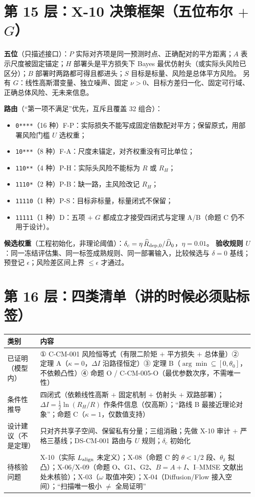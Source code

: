 \documentclass[UTF8,11pt,a4paper]{ctexart}
\begin{document}
\section{第 15 层：X-10 决策框架（五位布尔 $+$ $G$）}

\textbf{五位}（只描述接口）：$P$ 实际对齐项是同一预测时点、正确配对的平方距离；$A$ 表示尺度被固定锚定；$H$ 部署头是平方损失下 Bayes 最优仿射头（或实际头风险已区分）；$B$ 部署时两路都可得且都进头；$S$ 目标是标量、风险是总体平方风险。
另有 $G$：线性高斯潜变量、独立噪声、固定 $\nu>0$、目标方差归一化、固定可行域、正确总体风险、无未来信息。

\textbf{路由}（``第一项不满足''优先，互斥且覆盖 32 组合）：
\begin{itemize}
  \item \texttt{0****}（16 种）F-P：实际损失不能写成固定倍数配对平方；保留原式，用部署风险门槛 $U$ 选权重；
  \item \texttt{10***}（8 种）F-A：尺度未锚定，对齐权重没有可比单位；
  \item \texttt{110**}（4 种）P-H：实际头风险不能标为 $R$ 或 $R_H$；
  \item \texttt{1110*}（2 种）P-B：缺一路，主风险改记 $R_H$；
  \item \texttt{11110}（1 种）P-S：目标非标量，标量闭式不保留；
  \item \texttt{11111}（1 种）D：五项 $+$ $G$ 都成立才接受四闭式与定理 A/B（命题 C 仍不用于设计）。
\end{itemize}
\textbf{候选权重}（工程初始化，非理论阈值）：$\delta_c=\eta\,\widehat R_{{\rm dep},0}/\widehat D_0$，$\eta=0.01$。
\textbf{验收规则 $U$}：同一冻结评估集、同一标签成熟规则、同一部署输入，比较候选与 $\delta=0$ 基线；预登记 $\epsilon$；风险差区间上界 $\le\epsilon$ 才通过。

\section{第 16 层：四类清单（讲的时候必须贴标签）}

\begin{longtable}{p{}p{}}
\toprule
类别 & 内容\\
\midrule
已证明（模型内） & ① C-CM-001 风险恒等式（有限二阶矩 $+$ 平方损失 $+$ 总体量）② 定理 A（$\kappa=0$，$\Delta I$ 沿路径恒定）③ 定理 B（$\arg\min\subseteq[0,\theta_0]$，不依赖凸性）④ 命题 O / C-CM-005-O（最优参数次序，不需唯一性）\\
条件性推导 & 四闭式（依赖线性高斯 $+$ 固定机制 $+$ 仿射头 $+$ 双路部署）；$\Delta I=\frac12\ln(R_H/R)$ 作条件信息（仅高斯）；``路线 B 最接近理论对象''；命题 C（$\kappa=1$，仅数值支持）\\
设计建议（不是定理） & 只对齐共享子空间、保留私有分量；三组消融；先做 X-10 审计 $+$ 严格三基线；DS-CM-001 路由与 $U$ 规则；$\delta_c$ 初始化\\
待核验问题 & X-10（实际 $L_{\rm align}$ 未定义）；X-08（命题 C 的 $\theta<1/2$ 段、$\theta_\delta$ 拟凸）；X-06/X-09（命题 O、G1、G2、$B=A+I$、I--MMSE 文献出处未核验）；X-03（$\omega$ 取值冲突）；X-04（Diffusion/Flow 接入空间）；``扫描唯一极小 $\ne$ 全局证明''\\
\bottomrule
\end{longtable}
\end{document}
